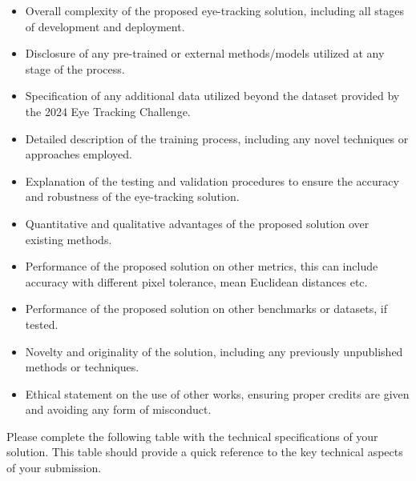 \documentclass{article}
\begin{document}
\begin{itemize}
    \item Overall complexity of the proposed eye-tracking solution, including all stages of development and deployment.
    \item Disclosure of any pre-trained or external methods/models utilized at any stage of the process.
    \item Specification of any additional data utilized beyond the dataset provided by the 2024 Eye Tracking Challenge.
    \item Detailed description of the training process, including any novel techniques or approaches employed.
    \item Explanation of the testing and validation procedures to ensure the accuracy and robustness of the eye-tracking solution.
    \item Quantitative and qualitative advantages of the proposed solution over existing methods.
    \item Performance of the proposed solution on other metrics, this can include accuracy with different pixel tolerance, mean Euclidean distances etc. 
    \item Performance of the proposed solution on other benchmarks or datasets, if tested.
    \item Novelty and originality of the solution, including any previously unpublished methods or techniques.
    \item Ethical statement on the use of other works, ensuring proper credits are given and avoiding any form of misconduct.
\end{itemize}

Please complete the following table with the technical specifications of your solution. This table should provide a quick reference to the key technical aspects of your submission.

\begin{table}[h]
    \centering
    \caption{Technical Specification of the Proposed Eye-Tracking Solution}
    \label{tab:eye_tracking_solution}
\end{table}
\end{document}
